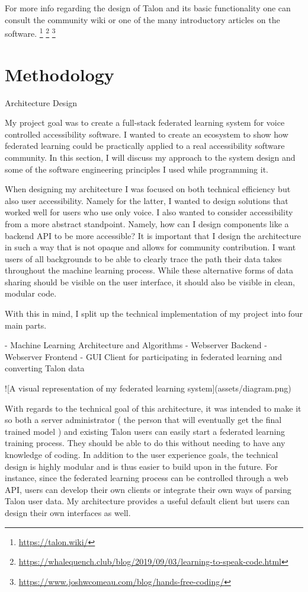 \documentclass[manuscript,screen,review]{acmart}
\begin{document}
For more info regarding the design of Talon and its basic functionality one can consult the community wiki or one of the many introductory articles on the software. \footnote{\url{https://talon.wiki/}} \footnote{\url{https://whalequench.club/blog/2019/09/03/learning-to-speak-code.html}} \footnote{\url{https://www.joshwcomeau.com/blog/hands-free-coding/}}


\section{Methodology}
Architecture Design

My project goal was to create a full-stack federated learning system for voice controlled accessibility software. I wanted to create an ecosystem to show how federated learning could be practically applied to a real accessibility software community. In this section, I will discuss my approach to the system design and some of the software engineering principles I used while programming it.

When designing my architecture I was focused on both technical efficiency but also user accessibility. Namely for the latter, I wanted to design solutions that worked well for users who use only voice. I also wanted to consider accessibility from a more abstract standpoint. Namely, how can I design components like a backend API to be more accessible? It is important that I design the architecture in such a way that is not opaque and allows for community contribution. I want users of all backgrounds to be able to clearly trace the path their data takes throughout the machine learning process. While these alternative forms of data sharing should be visible on the user interface, it should also be visible in clean, modular code.

With this in mind, I split up the technical implementation of my project into four main parts.

- Machine Learning Architecture and Algorithms
- Webserver Backend
- Webserver Frontend
- GUI Client for participating in federated learning and converting Talon data

![A visual representation of my federated learning system](assets/diagram.png)

With regards to the technical goal of this architecture, it was intended to make it so both a server administrator ( the person that will eventually get the final trained model ) and existing Talon users can easily start a federated learning training process. They should be able to do this without needing to have any knowledge of coding. In addition to the user experience goals, the technical design is highly modular and is thus easier to build upon in the future. For instance, since the federated learning process can be controlled through a web API, users can develop their own clients or integrate their own ways of parsing Talon user data. My architecture provides a useful default client but users can design their own interfaces as well.
\end{document}
